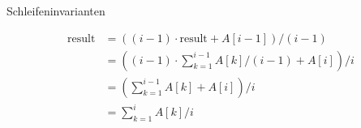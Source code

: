 \documentclass{article}
\begin{document}
\begin{exercise}{Schleifeninvarianten}
\begin{solution}
\begin{enumerate}
\begin{invariant}
{\begin{align*}
                  \text{result} & = ((i-1)\cdot \text{result} + A[i-1])/(i-1)        \\
                                & = ((i-1)\cdot\sum_{k=1}^{i-1} A[k]/(i-1) + A[i])/i \\
                                & = (\sum_{k=1}^{i-1} A[k] + A[i])/i                 \\
                                & = \sum_{k=1}^{i} A[k]/i
                \end{align*}
              }
            \end{invariant}
    \end{enumerate}
  \end{solution}
\end{exercise}
\end{document}
